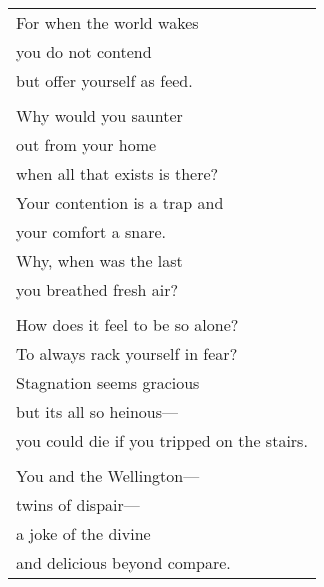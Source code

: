 \documentclass{article}
\begin{document}
\begin{center}
\begin{longtable}{l}
For when the world wakes \\
you do not contend \\
but offer yourself as feed. \\
\\
Why would you saunter \\
out from your home \\
when all that exists is there? \\
Your contention is a trap and \\
your comfort a snare. \\
Why, when was the last \\
you breathed fresh air? \\
\\
How does it feel to be so alone? \\
To always rack yourself in fear? \\
Stagnation seems gracious \\
but its all so heinous--- \\
you could die if you tripped on the stairs. \\
\\
You and the Wellington--- \\
twins of dispair--- \\
a joke of the divine \\
and delicious beyond compare. \\



\end{longtable}
\end{center}
\end{document}
